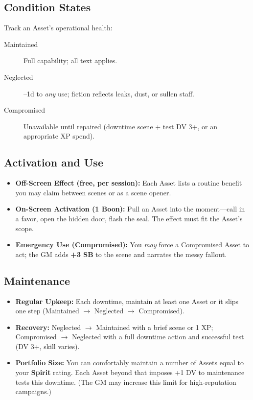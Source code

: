 \subsection*{Condition States}
Track an Asset's operational health:
\begin{description}
  \item[Maintained] Full capability; all text applies.
  \item[Neglected] –1d to \emph{any} use; fiction reflects leaks, dust, or sullen staff.
  \item[Compromised] Unavailable until repaired (downtime scene + test DV 3+, or an appropriate XP spend).
\end{description}

\subsection*{Activation and Use}
\begin{itemize}
  \item \textbf{Off-Screen Effect (free, per session):} Each Asset lists a routine benefit you may claim between scenes or as a scene opener.
  \item \textbf{On-Screen Activation (1 Boon):} Pull an Asset into the moment—call in a favor, open the hidden door, flash the seal. The effect must fit the Asset's scope.
  \item \textbf{Emergency Use (Compromised):} You \emph{may} force a Compromised Asset to act; the GM adds \textbf{+3 SB} to the scene and narrates the messy fallout.
\end{itemize}

\subsection*{Maintenance}
\begin{itemize}
  \item \textbf{Regular Upkeep:} Each downtime, maintain at least one Asset or it slips one step (Maintained \(\rightarrow\) Neglected \(\rightarrow\) Compromised).
  \item \textbf{Recovery:} Neglected \(\rightarrow\) Maintained with a brief scene or 1 XP; Compromised \(\rightarrow\) Neglected with a full downtime action and successful test (DV 3+, skill varies).
  \item \textbf{Portfolio Size:} You can comfortably maintain a number of Assets equal to your \textbf{Spirit} rating. Each Asset beyond that imposes +1 DV to maintenance tests this downtime. (The GM may increase this limit for high‑reputation campaigns.) 
\end{itemize}

